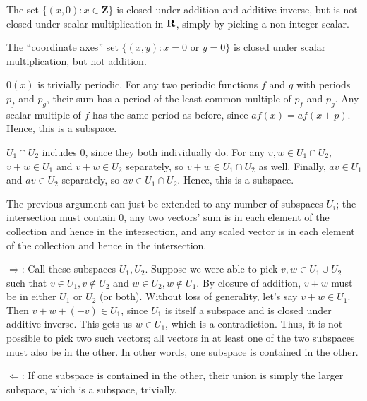 \documentclass{article}
\begin{document}
The set $\{(x, 0) : x \in \mathbf{Z}\}$ is closed under addition and additive
inverse, but is not closed under scalar multiplication in $\mathbf{R}$, simply by
picking a non-integer scalar.


The ``coordinate axes'' set $\{(x, y) : x = 0 \text{ or } y = 0\}$ is closed
under scalar multiplication, but not addition.


$0(x)$ is trivially periodic. For any two periodic functions $f$ and $g$ with
periods $p_f$ and $p_g$, their sum has a period of the least common multiple of
$p_f$ and $p_g$. Any scalar multiple of $f$ has the same period as before, since
$af(x) = af(x + p)$. Hence, this is a subspace.


$U_1 \cap U_2$ includes 0, since they both individually do. For any $v, w \in
U_1 \cap U_2$, $v + w \in U_1$ and $v + w \in U_2$ separately, so $v + w \in U_1
\cap U_2$ as well. Finally, $av \in U_1$ and $av \in U_2$ separately, so $av \in
U_1 \cap U_2$. Hence, this is a subspace.


The previous argument can just be extended to any number of subspaces $U_i$; the
intersection must contain 0, any two vectors' sum is in each element of the
collection and hence in the intersection, and any scaled vector is in each
element of the collection and hence in the intersection.


$\Rightarrow$: Call these subspaces $U_1, U_2$. Suppose we were able to pick $v,
w \in U_1 \cup U_2$ such that $v \in U_1, v \notin U_2$ and $w \in U_2, w \notin
U_1$. By closure of addition, $v + w$ must be in either $U_1$ or $U_2$ (or
both). Without loss of generality, let's say $v + w \in U_1$. Then $v + w + (-v)
\in U_1$, since $U_1$ is itself a subspace and is closed under additive inverse.
This gets us $w \in U_1$, which is a contradiction. Thus, it is not possible to
pick two such vectors; all vectors in at least one of the two subspaces must
also be in the other. In other words, one subspace is contained in the other.

$\Leftarrow$: If one subspace is contained in the other, their union is simply
the larger subspace, which is a subspace, trivially.
\end{document}
